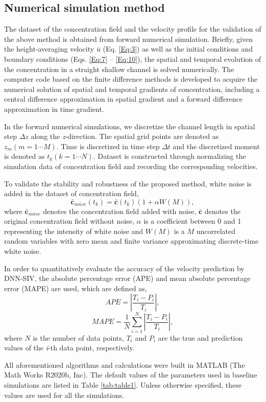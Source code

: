 \documentclass{article}
\begin{document}
\subsection{Numerical simulation method}
\label{Simulation}
The dataset of the concentration field and the velocity profile for the validation of the above method is obtained from forward numerical simulation. Briefly, given the height-averaging velocity $\bar{u}$ (Eq. \ref{Eq:3}) as well as the initial conditions and boundary conditions (Eqs. \ref{Eq:7} -- \ref{Eq:10}), the spatial and temporal evolution of the concentration in a straight shallow channel is solved numerically. The computer code based on the finite difference methods is developed to acquire the numerical solution of spatial and temporal gradients of concentration, including a central difference approximation in spatial gradient and a forward difference approximation in time gradient. \par
In the forward numerical simulations, we discretize the channel length in spatial step $\Delta z$ along the \emph{z}-direction. The spatial grid points are denoted as $z_m(m = 1\cdots M)$. Time is discretized in time step $\Delta t$ and the discretized moment is denoted as $t_k (k = 1 \cdots N)$. Dataset is constructed through normalizing the simulation data of concentration field and recording the corresponding velocities.\par
To validate the stability and robustness of the proposed method, white noise is added in the dataset of concentration field,
\begin{equation}
	\bar{\mathbf{c}}_{noise}\left(t_k\right)=\bar{\mathbf{c}}\left(t_k\right)\left(1+\alpha W\left(M\right)\right),
\end{equation}
where $\bar{\mathbf{c}}_{noise}$ denotes the concentration field added with noise, $\bar{\mathbf{c}}$ denotes the original concentration field without noise, $\alpha$ is a coefficient between 0 and 1 representing the intensity of white noise and $W(M)$ is a $M$ uncorrelated random variables with zero mean and finite variance approximating discrete-time white noise.\par
In order to quantitatively evaluate the accuracy of the velocity prediction by DNN-SIV, the absolute percentage error (APE) and mean absolute percentage error (MAPE) are used, which are defined as,
\begin{equation}
	APE=\left|\frac{T_i-P_i}{T_i}\right|,
\end{equation}
\begin{equation}
	MAPE=\frac{1}{N}\sum_{i=1}^{N}\left|\frac{T_i-P_i}{T_i}\right|,
\end{equation}
where $N$ is the number of data points, $T_i$ and $P_i$ are the true and prediction values of the \emph{i}-th data point, respectively.\par
All aforementioned algorithms and calculations were built in MATLAB (The Math Works R2020b, Inc). The default values of the parameters used in baseline simulations are listed in Table \ref{tab:table1}. Unless otherwise specified, these values are used for all the simulations.
\end{document}
